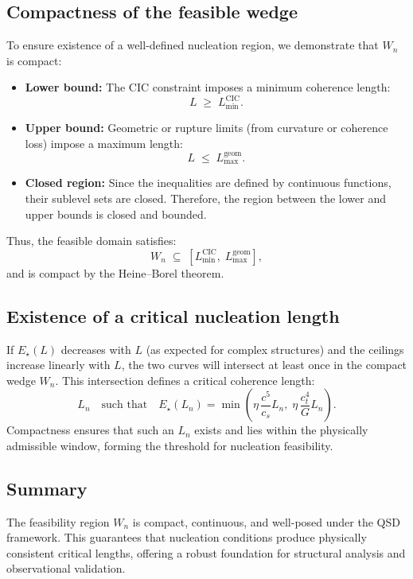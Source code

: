 \documentclass[preprints,article,submit,pdftex,moreauthors]{Definitions/mdpi}
\begin{document}
\subsection[\appendixname~\thesubsection]{Compactness of the feasible wedge}
To ensure existence of a well-defined nucleation region, we demonstrate that \( W_n \) is compact:

\begin{itemize}
  \item \textbf{Lower bound:}  
  The CIC constraint imposes a minimum coherence length:
  \[
  L \;\ge\; L_{\min}^{\mathrm{CIC}}.
  \]

  \item \textbf{Upper bound:}  
  Geometric or rupture limits (from curvature or coherence loss) impose a maximum length:
  \[
  L \;\le\; L_{\max}^{\mathrm{geom}}.
  \]

  \item \textbf{Closed region:}  
  Since the inequalities are defined by continuous functions, their sublevel sets are closed. Therefore, the region between the lower and upper bounds is closed and bounded.
\end{itemize}

Thus, the feasible domain satisfies:
\begin{equation}
W_n \;\subseteq\; \left[ L_{\min}^{\mathrm{CIC}},\; L_{\max}^{\mathrm{geom}} \right],
\end{equation}
and is compact by the Heine–Borel theorem.

\subsection[\appendixname~\thesubsection]{Existence of a critical nucleation length}
If \( E_\star(L) \) decreases with \( L \) (as expected for complex structures) and the ceilings increase linearly with \( L \), the two curves will intersect at least once in the compact wedge \( W_n \). This intersection defines a critical coherence length:
\[
L_n \quad\text{such that}\quad E_\star(L_n) = \min\!\left(\eta\,\frac{c^5}{c_s}L_n,\; \eta\,\frac{c_t^4}{G}L_n\right).
\]
Compactness ensures that such an \( L_n \) exists and lies within the physically admissible window, forming the threshold for nucleation feasibility.

\subsection[\appendixname~\thesubsection]{Summary}
The feasibility region \( W_n \) is compact, continuous, and well-posed under the QSD framework. This guarantees that nucleation conditions produce physically consistent critical lengths, offering a robust foundation for structural analysis and observational validation.
\end{document}
